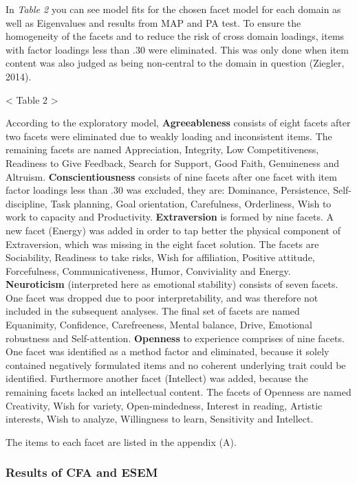 \documentclass[,man,floatsintext]{apa6}
\theoremstyle{definition}
\theoremstyle{definition}
\theoremstyle{definition}
\theoremstyle{remark}
\begin{document}
In \emph{Table 2} you can see model fits for the chosen facet model for
each domain as well as Eigenvalues and results from MAP and PA test. To
ensure the homogeneity of the facets and to reduce the risk of cross
domain loadings, items with factor loadings less than .30 were
eliminated. This was only done when item content was also judged as
being non-central to the domain in question (Ziegler, 2014).

\textless{} Table 2 \textgreater{}

According to the exploratory model, \textbf{Agreeableness} consists of
eight facets after two facets were eliminated due to weakly loading and
inconsistent items. The remaining facets are named Appreciation,
Integrity, Low Competitiveness, Readiness to Give Feedback, Search for
Support, Good Faith, Genuineness and Altruism.
\textbf{Conscientiousness} consists of nine facets after one facet with
item factor loadings less than .30 was excluded, they are: Dominance,
Persistence, Self-discipline, Task planning, Goal orientation,
Carefulness, Orderliness, Wish to work to capacity and Productivity.
\textbf{Extraversion} is formed by nine facets. A new facet (Energy) was
added in order to tap better the physical component of Extraversion,
which was missing in the eight facet solution. The facets are
Sociability, Readiness to take risks, Wish for affiliation, Positive
attitude, Forcefulness, Communicativeness, Humor, Conviviality and
Energy. \textbf{Neuroticism} (interpreted here as emotional stability)
consists of seven facets. One facet was dropped due to poor
interpretability, and was therefore not included in the subsequent
analyses. The final set of facets are named Equanimity, Confidence,
Carefreeness, Mental balance, Drive, Emotional robustness and
Self-attention. \textbf{Openness} to experience comprises of nine
facets. One facet was identified as a method factor and eliminated,
because it solely contained negatively formulated items and no coherent
underlying trait could be identified. Furthermore another facet
(Intellect) was added, because the remaining facets lacked an
intellectual content. The facets of Openness are named Creativity, Wish
for variety, Open-mindedness, Interest in reading, Artistic interests,
Wish to analyze, Willingness to learn, Sensitivity and Intellect.

The items to each facet are listed in the appendix (A).

\hypertarget{results-of-cfa-and-esem}{%
\subsubsection{Results of CFA and ESEM}\label{results-of-cfa-and-esem}}
\end{document}

